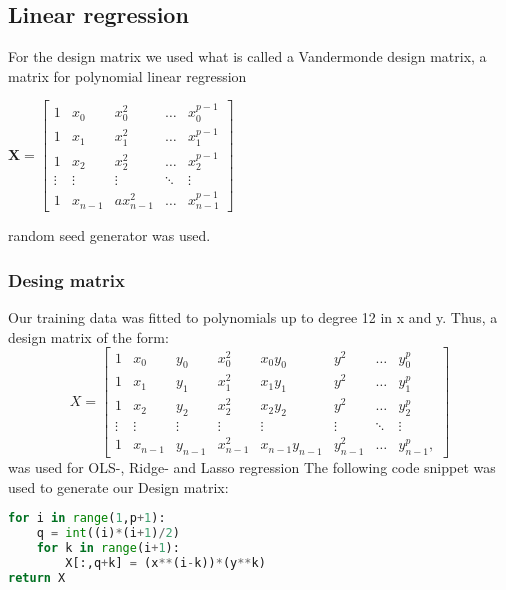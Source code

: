 \subsection{Linear regression}
For the design matrix we used what is called a Vandermonde design matrix, a matrix for polynomial linear regression
\begin{center}
$\boldsymbol{X}=
\begin{bmatrix} 
1 & x_{0}&x_{0}^{2}&\dots &x_{0}^{p-1}
\\1&x_{1}&x_{1}^{2}&\dots &x_{1}^{p-1}
\\1&x_{2}&x_{2}^{2}&\dots &x_{2}^{p-1}
\\ \vdots &\vdots &\vdots &\ddots &\vdots \\
1&x_{n-1}&ax_{n-1}^{2}&\dots &x_{n-1}^{p-1}
\end{bmatrix}
$
\end{center}

random seed generator was used. 

\subsubsection{Desing matrix}

Our training data was fitted to polynomials up
to degree 12 in x and y. Thus, a design matrix of the form:
\begin{equation*}
    X = 
    \begin{bmatrix}

        1 & x_{0} & y_0 & x_{0}^{2} & x_0 y_0 & y^2 & \dots &y_{0}^{p} \\
        1 & x_{1} & y_1 & x_{1}^{2} & x_1 y_1 & y^2 & \dots &y_{1}^{p} \\
        1 & x_{2} & y_2 & x_{2}^{2} & x_2 y_2 & y^2 & \dots &y_{2}^{p} \\
        \vdots &\vdots &\vdots &\vdots &\vdots & \vdots & \ddots & \vdots \\
        1&x_{n-1} & y_{n-1} & x_{n-1}^2 & x_{n-1} y_{n-1} & y_{n-1}^2 & \dots &y_{n-1}^{p}, 
    \end{bmatrix}
\end{equation*}
was used for OLS-, Ridge- and Lasso regression
The following code snippet was used to generate our Design matrix: 
\begin{lstlisting}[language=Python]
for i in range(1,p+1):
    q = int((i)*(i+1)/2)
    for k in range(i+1):
        X[:,q+k] = (x**(i-k))*(y**k)
return X
\end{lstlisting}

